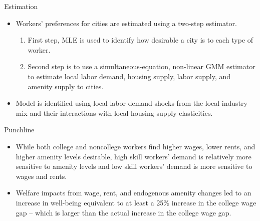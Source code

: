 \documentclass[aspectratio=169]{beamer}
\begin{document}
\begin{frame}{Estimation}

\begin{itemize}
    \item<1-> Workers’ preferences for cities are estimated using a two-step estimator.
    \begin{enumerate}
        \item<2-> First step, MLE is used to identify how desirable a city is to each type of worker.
        \item<3-> Second step is to use a simultaneous-equation, non-linear GMM estimator to estimate local labor demand, housing supply, labor supply, and amenity supply to cities.
    \end{enumerate}
    \item<4-> Model is identified using local labor demand shocks from the local industry mix and their interactions with local housing supply elasticities. 
\end{itemize}
    
\end{frame}


\begin{frame}{Punchline}

\begin{itemize}
    \item<1-> While both college and noncollege workers find higher wages, lower rents, and higher amenity levels desirable, high skill workers’ demand is relatively more sensitive to amenity levels and low skill workers’ demand is more sensitive to wages and rents.
    \item<2->   Welfare impacts from wage, rent, and endogenous amenity changes led to an increase in well-being equivalent to at least a 25\% increase in the college wage gap – which is larger than the actual increase in the college wage gap.
\end{itemize}
    
\end{frame}

\end{document}
